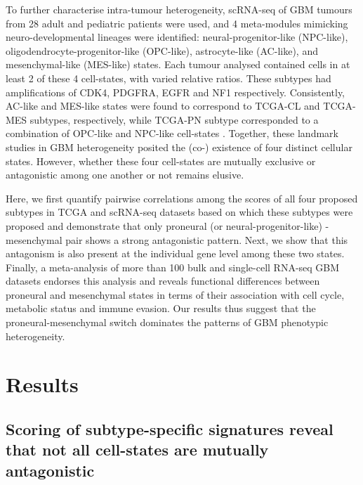 \documentclass[11pt,a4paper]{article}
\begin{document}
To further characterise intra-tumour heterogeneity, scRNA-seq of GBM tumours from 28 adult and pediatric patients were used, and 4 meta-modules mimicking neuro-developmental lineages were identified: neural-progenitor-like (NPC-like), oligodendrocyte-progenitor-like (OPC-like), astrocyte-like (AC-like), and mesenchymal-like (MES-like) states. Each tumour analysed contained cells in at least 2 of these 4 cell-states, with varied relative ratios. These subtypes had amplifications of CDK4, PDGFRA, EGFR and NF1 respectively. Consistently, AC-like and MES-like states were found to correspond to TCGA-CL and TCGA-MES subtypes, respectively, while TCGA-PN subtype corresponded to a combination of OPC-like and NPC-like cell-states \parencite{Neftel}. Together, these landmark studies in GBM heterogeneity posited the (co-) existence of four distinct cellular states. However, whether these four cell-states are mutually exclusive or antagonistic among one another or not remains elusive. 

Here, we first quantify pairwise correlations among the scores of all four proposed subtypes in TCGA and scRNA-seq datasets based on which these subtypes were proposed and demonstrate that only proneural (or neural-progenitor-like) - mesenchymal pair shows a strong antagonistic pattern. Next, we show that this antagonism is also present at the individual gene level among these two states. Finally, a meta-analysis of more than 100 bulk and single-cell RNA-seq GBM datasets endorses this analysis and reveals functional differences between proneural and mesenchymal states in terms of their association with cell cycle, metabolic status and immune evasion. Our results thus suggest that the proneural-mesenchymal switch dominates the patterns of GBM phenotypic heterogeneity.

\section{Results}
\subsection{Scoring of subtype-specific signatures reveal that not all cell-states are mutually antagonistic}
\end{document}
